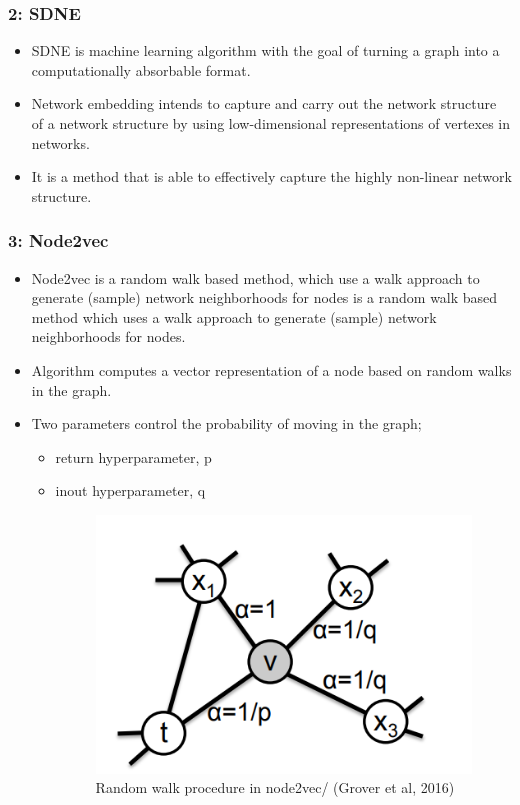 \documentclass{beamer}
\begin{document}
\begin{frame}
\frametitle{2: SDNE }
\begin{itemize}
\item  SDNE is machine learning algorithm  with the goal of turning a graph into a computationally  absorbable format. 
\vspace{10pt}
\item  Network embedding intends to capture and carry out the network structure of a network structure by using low-dimensional representations of vertexes in networks. 
\vspace{10pt}
  \item   It is  a method that is
able to effectively capture the highly non-linear network structure.
\end{itemize}


\end{frame}

\begin{frame}
\frametitle{3: Node2vec}
\begin{itemize}
\item  Node2vec is a random walk based method, which  use a walk approach to generate (sample) network neighborhoods for nodes is a random walk based method which  uses a walk approach to generate (sample) network neighborhoods for nodes. 
\vspace{10 pt}
\item Algorithm computes a vector representation of a node based on random walks in the graph.
\vspace{10 pt}
\item  Two parameters control the probability of moving in the graph;
\begin{itemize}
\item return hyperparameter, p 
\item inout hyperparameter, q 
\begin{figure}[h!]
  \centering
  \includegraphics[width=.4\linewidth]{n2v.png}
  \caption{Random walk procedure in node2vec/ (Grover et al, 2016)}
  \label{fig:fig1}
\end{figure}
\end{itemize}

\end{itemize}
\end{frame}
\end{document}
